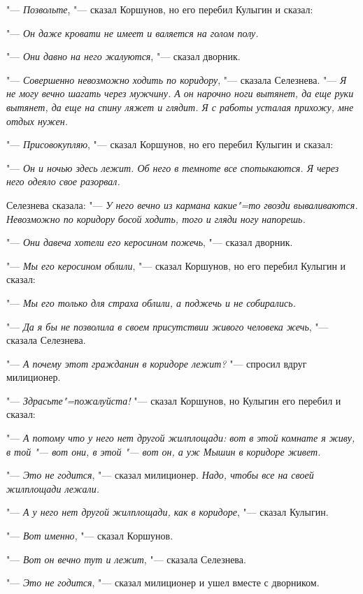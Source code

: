 "--- \textit{Позвольте}, "--- сказал Коршунов,  но  его
перебил Кулыгин и сказал:

"--- \textit{Он даже кровати не имеет и валяется на
голом полу.}

"--- \textit{Они  давно  на него жалуются}, "--- сказал
дворник.

"--- \textit{Совершенно  невозможно ходить по коридору}, "--- сказала  Селезнева. "--- \textit{Я не могу вечно шагать через мужчину.  А  он нарочно ноги
вытянет, да еще руки вытянет, да еще на спину ляжет и глядит. Я с работы усталая прихожу, мне отдых нужен.}

"--- \textit{Присовокупляю}, "---  сказал  Коршунов, но
его перебил Кулыгин и сказал:

"--- \textit{Он и ночью здесь лежит. Об него в темноте все  спотыкаются.  Я  через него одеяло
свое разорвал.}

Селезнева сказала:
"--- \textit{У него вечно из кармана какие"=то гвозди вываливаются.  Невозможно по коридору босой ходить, того и гляди ногу напорешь.}

"--- \textit{Они  давеча хотели  его  керосином пожечь}, "--- сказал дворник.

"--- \textit{Мы его керосином облили}, "--- сказал Коршунов, но его перебил Кулыгин и сказал:

"--- \textit{Мы  его  только  для страха облили,  а
поджечь и не собирались.}

"--- \textit{Да я бы не позволила в  своем  присутствии живого человека жечь}, "--- сказала Селезнева.

"--- \textit{А почему этот гражданин в коридоре лежит?} "--- спросил вдруг милиционер.

"--- \textit{Здрасьте"=пожалуйста!}  "---  сказал Коршунов, но Кулыгин его перебил и сказал:

"--- \textit{А  потому  что  у него нет другой жилплощади: вот в этой комнате я живу, в той  "---
вот они, в этой "--- вот он, а уж Мышин в коридоре живет.}

"--- \textit{Это не годится}, "--- сказал милиционер. \textit{Надо, чтобы все на своей жилплощади лежали.}

"--- \textit{А у него  нет другой жилплощади, как в
коридоре}, "--- сказал Кулыгин.

"--- \textit{Вот именно}, "--- сказал Коршунов.

"--- \textit{Вот он вечно тут  и  лежит}, "---  сказала
Селезнева.

"--- \textit{Это не годится}, "--- сказал милиционер  и
ушел вместе с дворником.

